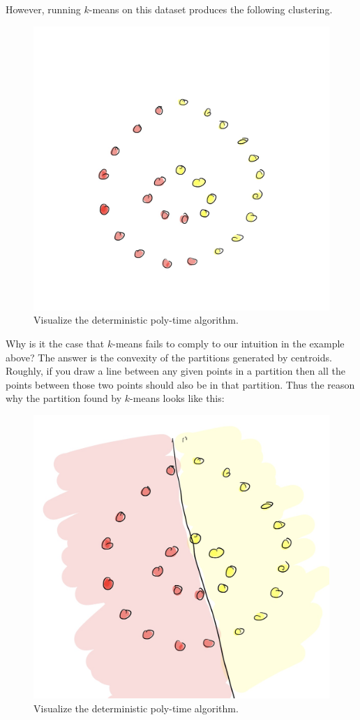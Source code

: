 However, running $k$-means on this dataset produces the following clustering.

\begin{figure}[h]
\centering
\includegraphics[width=.7\linewidth]{chapter_2/files/kmeans.jpg}
\caption{Visualize the deterministic poly-time algorithm. }
\end{figure}

Why is it the case that $k$-means fails to comply to our intuition in the example
above? The answer is the convexity of the partitions generated by centroids. Roughly,
if you draw a line between any given points in a partition then all the points
between those two points should also be in that partition. Thus the reason
why the partition found by $k$-means looks like this:

\begin{figure}[h]
\centering
\includegraphics[width=.7\linewidth]{chapter_2/files/voronoi-cell.jpg}
\caption{Visualize the deterministic poly-time algorithm. }
\end{figure}


